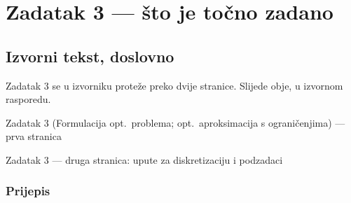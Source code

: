 \chapter{Zadatak 3 --- što je točno zadano}
\label{ch:z3-zadatak}

\section{Izvorni tekst, doslovno}
\label{sec:z3-izvorni}

Zadatak 3 se u izvorniku proteže preko dvije stranice. Slijede obje, u
izvornom rasporedu.

\begin{zadatak}{Zadatak 3 (Formulacija opt.\ problema; opt.\ aproksimacija s ograničenjima) --- prva stranica}
\end{zadatak}

\begin{zadatak}{Zadatak 3 --- druga stranica: upute za diskretizaciju i podzadaci}
\end{zadatak}

\subsection{Prijepis}

